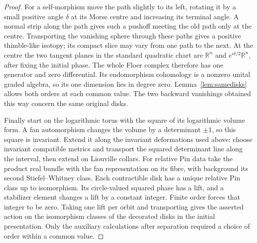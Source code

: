 \begin{proof}
For a self-morphism move the path slightly to its left, rotating it by a small positive angle $\delta$ at its Morse centre and increasing its terminal angle. A normal strip along the path gives such a pushoff meeting the old path only at the centre. Transporting the vanishing sphere through these paths gives a positive thimble-like isotopy; its compact slice may vary from one path to the next. At the centre the two tangent planes in the standard quadratic chart are $\mathbb R^n$ and $e^{i\delta/2}\mathbb R^n$, after fixing the initial phase. The whole Floer complex therefore has one generator and zero differential. Its endomorphism cohomology is a nonzero unital graded algebra, so its one dimension lies in degree zero. Lemma~\ref{lem:samedisks} allows both orders at each common value. The two backward vanishings obtained this way concern the same original disks.

Finally start on the logarithmic torus with the square of its logarithmic volume form. A fan automorphism changes the volume by a determinant $\pm1$, so this square is invariant. Extend it along the invariant deformations used above: choose invariant compatible metrics and transport the squared determinant line along the interval, then extend on Liouville collars. For relative Pin data take the product real bundle with the fan representation on its fibre, with background its second Stiefel--Whitney class. Each contractible disk has a unique relative Pin class up to isomorphism. Its circle-valued squared phase has a lift, and a stabilizer element changes a lift by a constant integer. Finite order forces that integer to be zero. Taking one lift per orbit and transporting gives the asserted action on the isomorphism classes of the decorated disks in the initial presentation. Only the auxiliary calculations after separation required a choice of order within a common value.
\end{proof}
